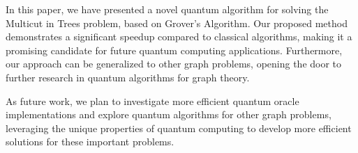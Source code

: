 In this paper, we have presented a novel quantum algorithm for solving the Multicut in Trees problem, based on Grover's Algorithm. Our proposed method demonstrates a significant speedup compared to classical algorithms, making it a promising candidate for future quantum computing applications. Furthermore, our approach can be generalized to other graph problems, opening the door to further research in quantum algorithms for graph theory.

As future work, we plan to investigate more efficient quantum oracle implementations and explore quantum algorithms for other graph problems, leveraging the unique properties of quantum computing to develop more efficient solutions for these important problems.

